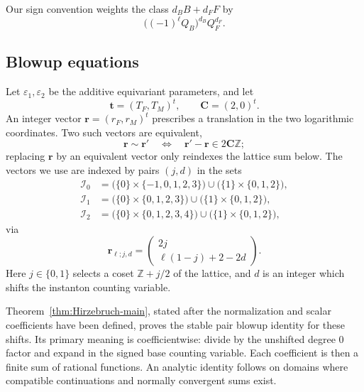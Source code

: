 \documentclass{amsart}
\theoremstyle{definition}
\numberwithin{equation}{section}
\newcommand{\Z}{\mathbb Z}
\newcommand{\eps}{\varepsilon}
\begin{document}
Our sign convention weights the class \(d_BB+d_FF\) by
\begin{equation}
 \bigl((-1)^\ell Q_B\bigr)^{d_B}Q_F^{d_F}.
\label{eq:intro-signed-Novikov-specialization}
\end{equation}

\subsection{Blowup equations}
Let \(\eps_1,\eps_2\) be the additive equivariant parameters, and let
\[
 \mathbf t=(T_F,T_M)^t,\qquad \mathbf C=(2,0)^t.
\]
An integer vector \(\mathbf r=(r_F,r_M)^t\) prescribes a translation in the two logarithmic coordinates.  Two such vectors are equivalent,
\begin{equation}
 \mathbf r\sim\mathbf r'
 \quad\Longleftrightarrow\quad
 \mathbf r'-\mathbf r\in2\mathbf C\Z;
\label{eq:Hirzebruch-r-equivalence}
\end{equation}
replacing \(\mathbf r\) by an equivalent vector only reindexes the lattice sum below.  The vectors we use are indexed by pairs \((j,d)\) in the sets
\begin{equation}
\begin{aligned}
 \mathcal I_0&=
 \bigl(\{0\}\times\{-1,0,1,2,3\}\bigr)
 \cup\bigl(\{1\}\times\{0,1,2\}\bigr),\\
 \mathcal I_1&=
 \bigl(\{0\}\times\{0,1,2,3\}\bigr)
 \cup\bigl(\{1\}\times\{0,1,2\}\bigr),\\
 \mathcal I_2&=
 \bigl(\{0\}\times\{0,1,2,3,4\}\bigr)
 \cup\bigl(\{1\}\times\{0,1,2\}\bigr),
\end{aligned}
\label{eq:intro-index-sets}
\end{equation}
via
\begin{equation}
\mathbf r_{\ell;j,d}
 =\begin{pmatrix}2j\\ \ell(1-j)+2-2d\end{pmatrix}.
\label{eq:Hirzebruch-main-shift}
\end{equation}
Here \(j\in\{0,1\}\) selects a coset \(\Z+j/2\) of the lattice, and \(d\) is an integer which shifts the instanton counting variable.

Theorem~\ref{thm:Hirzebruch-main}, stated after the normalization and scalar coefficients have been defined, proves the stable pair blowup identity for these shifts.  Its primary meaning is coefficientwise: divide by the unshifted degree \(0\) factor and expand in the signed base counting variable.  Each coefficient is then a finite sum of rational functions.  An analytic identity follows on domains where compatible continuations and normally convergent sums exist.
\end{document}

